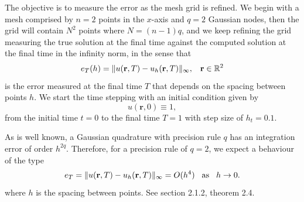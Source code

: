 \documentclass{uonmathreport}
\begin{document}
The objective is to measure the error as the mesh grid is refined. We begin with a mesh comprised by $n=2$ points in the $x$-axis and $q=2$ Gaussian nodes, then the grid will contain $N^2$ points where $N = (n-1)q$, and we keep refining the grid measuring the true solution at the final time against the computed solution at the final time in the infinity norm, in the sense that
\begin{equation}\label{eqn:2d_ex1_errormeasure}
	e_T(h) = \| u(\mathbf{r}, T) - u_h(\mathbf{r}, T)\|_{\infty}, \hspace{3mm} \mathbf{r}\in\mathbb{R}^2
\end{equation}
is the error measured at the final time $T$ that depends on the spacing between points $h$. We start the time stepping with an initial condition given by 
\begin{equation}
u(\textbf{r}, 0) \equiv 1,
\end{equation}
from the initial time $t=0$ to the final time $T=1$ with step size of $h_t=0.1$.

As is well known, a Gaussian quadrature with precision rule $q$ has an integration error of order $h^{2q}$. Therefore, for a precision rule of $q=2$, we expect a behaviour of the type
\begin{equation}
e_T = \| u(\mathbf{r}, T) - u_h(\mathbf{r}, T)\|_{\infty} = O(h^4)
\hspace{3mm} \textnormal{as}\hspace{3mm} h \rightarrow 0.
\end{equation}
where $h$ is the spacing between points. See \cite{lima2015numerical} section 2.1.2, theorem 2.4.
\end{document}
